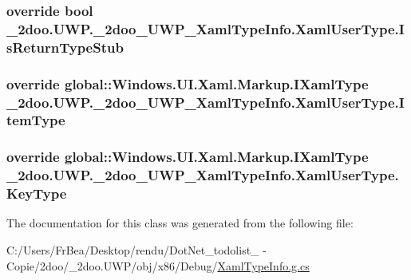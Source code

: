 \hypertarget{class__2doo_1_1_u_w_p_1_1__2doo___u_w_p___xaml_type_info_1_1_xaml_user_type_d086281416ede7666e6dd7b402a55c44}{
\subsubsection[{IsReturnTypeStub}]{\setlength{\rightskip}{0pt plus 5cm}override bool \_\-2doo.UWP.\_\-2doo\_\-UWP\_\-XamlTypeInfo.XamlUserType.IsReturnTypeStub}}
\label{class__2doo_1_1_u_w_p_1_1__2doo___u_w_p___xaml_type_info_1_1_xaml_user_type_d086281416ede7666e6dd7b402a55c44}


\hypertarget{class__2doo_1_1_u_w_p_1_1__2doo___u_w_p___xaml_type_info_1_1_xaml_user_type_6c8b29ce9e51ab0c845f131f8e6e9f98}{
\subsubsection[{ItemType}]{\setlength{\rightskip}{0pt plus 5cm}override global::Windows.UI.Xaml.Markup.IXamlType \_\-2doo.UWP.\_\-2doo\_\-UWP\_\-XamlTypeInfo.XamlUserType.ItemType}}
\label{class__2doo_1_1_u_w_p_1_1__2doo___u_w_p___xaml_type_info_1_1_xaml_user_type_6c8b29ce9e51ab0c845f131f8e6e9f98}


\hypertarget{class__2doo_1_1_u_w_p_1_1__2doo___u_w_p___xaml_type_info_1_1_xaml_user_type_ab70ce45012ade9ca21825136d066410}{
\subsubsection[{KeyType}]{\setlength{\rightskip}{0pt plus 5cm}override global::Windows.UI.Xaml.Markup.IXamlType \_\-2doo.UWP.\_\-2doo\_\-UWP\_\-XamlTypeInfo.XamlUserType.KeyType}}
\label{class__2doo_1_1_u_w_p_1_1__2doo___u_w_p___xaml_type_info_1_1_xaml_user_type_ab70ce45012ade9ca21825136d066410}




The documentation for this class was generated from the following file:\begin{CompactItemize}
\item 
C:/Users/FrBea/Desktop/rendu/DotNet\_\-todolist\_ - Copie/2doo/\_\-2doo.UWP/obj/x86/Debug/\hyperlink{_xaml_type_info_8g_8cs}{XamlTypeInfo.g.cs}\end{CompactItemize}
